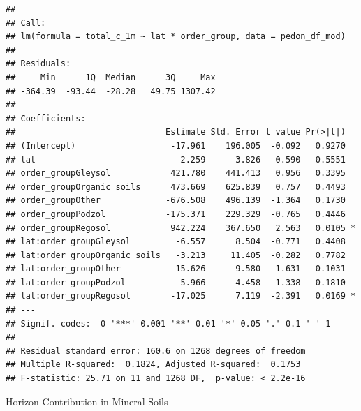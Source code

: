 \documentclass[
]{article}
\begin{document}
\begin{verbatim}
## 
## Call:
## lm(formula = total_c_1m ~ lat * order_group, data = pedon_df_mod)
## 
## Residuals:
##     Min      1Q  Median      3Q     Max 
## -364.39  -93.44  -28.28   49.75 1307.42 
## 
## Coefficients:
##                              Estimate Std. Error t value Pr(>|t|)  
## (Intercept)                   -17.961    196.005  -0.092   0.9270  
## lat                             2.259      3.826   0.590   0.5551  
## order_groupGleysol            421.780    441.413   0.956   0.3395  
## order_groupOrganic soils      473.669    625.839   0.757   0.4493  
## order_groupOther             -676.508    496.139  -1.364   0.1730  
## order_groupPodzol            -175.371    229.329  -0.765   0.4446  
## order_groupRegosol            942.224    367.650   2.563   0.0105 *
## lat:order_groupGleysol         -6.557      8.504  -0.771   0.4408  
## lat:order_groupOrganic soils   -3.213     11.405  -0.282   0.7782  
## lat:order_groupOther           15.626      9.580   1.631   0.1031  
## lat:order_groupPodzol           5.966      4.458   1.338   0.1810  
## lat:order_groupRegosol        -17.025      7.119  -2.391   0.0169 *
## ---
## Signif. codes:  0 '***' 0.001 '**' 0.01 '*' 0.05 '.' 0.1 ' ' 1
## 
## Residual standard error: 160.6 on 1268 degrees of freedom
## Multiple R-squared:  0.1824, Adjusted R-squared:  0.1753 
## F-statistic: 25.71 on 11 and 1268 DF,  p-value: < 2.2e-16
\end{verbatim}

Horizon Contribution in Mineral Soils
\end{document}

